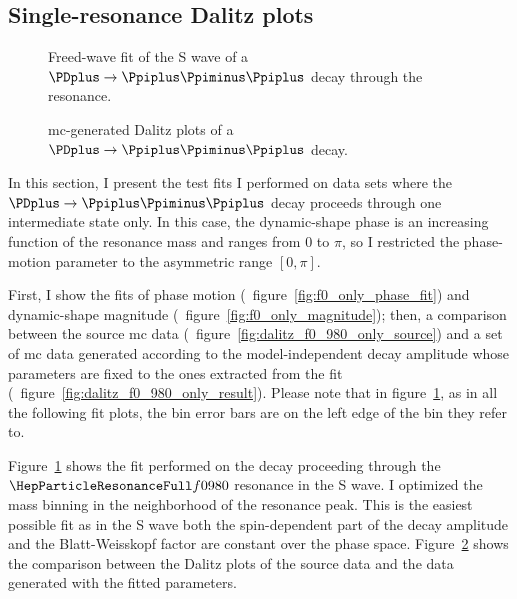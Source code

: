 \subsection{Single-resonance Dalitz plots}

    \begin{figure}
        \centering
        \subfloat[][\label{fig:f0_only_phase_fit}]{}

        \subfloat[][\label{fig:f0_only_magnitude}]{}
        \caption{Freed-wave fit of the S wave of a $\PDplus \to \Ppiplus\Ppiminus\Ppiplus$ decay through the \Pfnez{} resonance.~\Square} 
        \label{fig:f0_only}
    \end{figure}
    \begin{figure}
        \centering

        \caption{\ac{mc}-generated Dalitz plots of a $\PDplus \to \Ppiplus\Ppiminus\Ppiplus$ decay.~\Square}
        \label{fig:f0_only_dalitz}
    \end{figure}
    In this section, I present the test fits I performed on data sets where the $\PDplus\to\Ppiplus\Ppiminus\Ppiplus$ decay proceeds through one intermediate state only. 
    In this case, the dynamic-shape phase is an increasing function of the resonance mass and ranges from $0$ to $\pi$, so I restricted the phase-motion parameter to the asymmetric range $[0,\pi]$.


    First, I show the fits of phase motion (\eg~figure~\ref{fig:f0_only_phase_fit}) and dynamic-shape magnitude (\eg~figure~\ref{fig:f0_only_magnitude});
    then, a comparison between the source \ac{mc} data (\eg~figure~\ref{fig:dalitz_f0_980_only_source}) and a set of \ac{mc} data generated according to the model-independent decay amplitude whose parameters are fixed to the ones extracted from the fit (\eg~figure~\ref{fig:dalitz_f0_980_only_result}).
    Please note that in figure~\ref{fig:f0_only}, as in all the following fit plots, the bin error bars are on the left edge of the bin they refer to.


    Figure~\ref{fig:f0_only} shows the fit performed on the decay proceeding through the $\Pfnez{}$ resonance in the S wave.
    I optimized the mass binning in the neighborhood of the resonance peak.
    This is the easiest possible fit as in the S wave both the spin-dependent part of the decay amplitude and the Blatt-Weisskopf factor are constant over the phase space.
    Figure~\ref{fig:f0_only_dalitz} shows the comparison between the Dalitz plots of the source data and the data generated with the fitted parameters.


